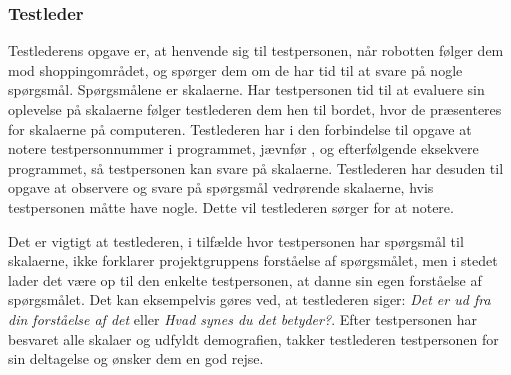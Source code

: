 \subsubsection*{Testleder}
%
Testlederens opgave er, at henvende sig til testpersonen, når robotten følger dem mod shoppingområdet, og spørger dem om de har tid til at svare på nogle spørgsmål. Spørgsmålene er skalaerne. Har testpersonen tid til at evaluere sin oplevelse på skalaerne følger testlederen dem hen til bordet, hvor de præsenteres for skalaerne på computeren. Testlederen har i den forbindelse til opgave at notere testpersonnummer i programmet, jævnfør , og efterfølgende eksekvere programmet, så testpersonen kan svare på skalaerne. Testlederen har desuden til opgave at observere og svare på spørgsmål vedrørende skalaerne, hvis testpersonen måtte have nogle. Dette vil testlederen sørger for at notere. 

Det er vigtigt at testlederen, i tilfælde hvor testpersonen har spørgsmål til skalaerne, ikke forklarer projektgruppens forståelse af spørgsmålet, men i stedet lader det være op til den enkelte testpersonen, at danne sin egen forståelse af spørgsmålet. Det kan eksempelvis gøres ved, at testlederen siger: \textit{Det er ud fra din forståelse af det} eller \textit{Hvad synes du det betyder?}. Efter testpersonen har besvaret alle skalaer og udfyldt demografien, takker testlederen testpersonen for sin deltagelse og ønsker dem en god rejse. 

